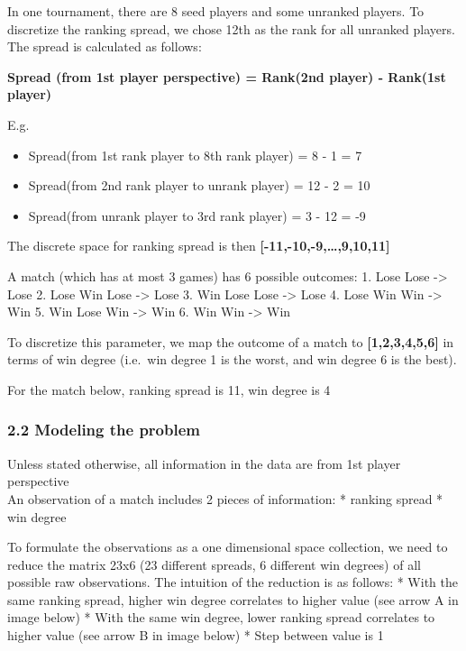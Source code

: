 \documentclass[11pt]{article}
\providecommand{\tightlist}{%
      \setlength{\itemsep}{0pt}\setlength{\parskip}{0pt}}
\begin{document}
In one tournament, there are 8 seed players and some unranked players.
To discretize the ranking spread, we chose 12th as the rank for all
unranked players. The spread is calculated as follows:

\textbf{Spread (from 1st player perspective) = Rank(2nd player) -
Rank(1st player)}

E.g.

\begin{itemize}
\tightlist
\item
  Spread(from 1st rank player to 8th rank player) = 8 - 1 = 7
\item
  Spread(from 2nd rank player to unrank player) = 12 - 2 = 10
\item
  Spread(from unrank player to 3rd rank player) = 3 - 12 = -9
\end{itemize}

The discrete space for ranking spread is then
\textbf{{[}-11,-10,-9,\ldots{},9,10,11{]}}

A match (which has at most 3 games) has 6 possible outcomes: 1. Lose
Lose -\textgreater{} Lose 2. Lose Win Lose -\textgreater{} Lose 3. Win
Lose Lose -\textgreater{} Lose 4. Lose Win Win -\textgreater{} Win 5.
Win Lose Win -\textgreater{} Win 6. Win Win -\textgreater{} Win

To discretize this parameter, we map the outcome of a match to
\textbf{{[}1,2,3,4,5,6{]}} in terms of win degree (i.e.~win degree 1 is
the worst, and win degree 6 is the best).

    For the match below, ranking spread is 11, win degree is 4

\hypertarget{modeling-the-problem}{%
\subsubsection{2.2 Modeling the problem}\label{modeling-the-problem}}

Unless stated otherwise, all information in the data are from 1st player
perspective\\
An observation of a match includes 2 pieces of information: * ranking
spread * win degree

To formulate the observations as a one dimensional space collection, we
need to reduce the matrix 23x6 (23 different spreads, 6 different win
degrees) of all possible raw observations. The intuition of the
reduction is as follows: * With the same ranking spread, higher win
degree correlates to higher value (see arrow A in image below) * With
the same win degree, lower ranking spread correlates to higher value
(see arrow B in image below) * Step between value is 1
\end{document}
